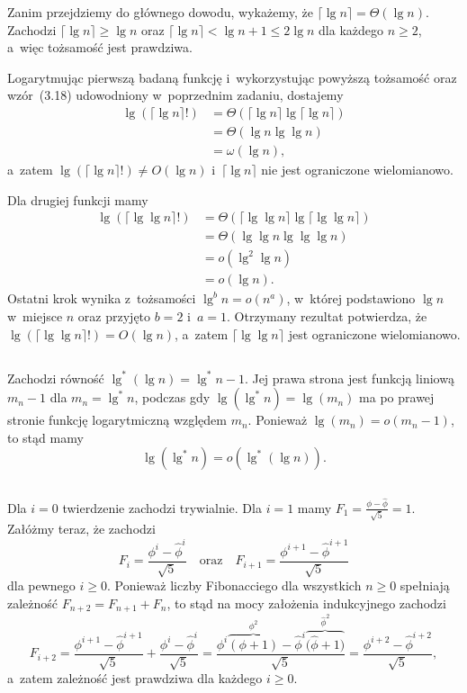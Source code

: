 Zanim przejdziemy do głównego dowodu, wykażemy, że $\lceil\lg n\rceil=\Theta(\lg n)$. Zachodzi $\lceil\lg n\rceil\ge\lg n$ oraz $\lceil\lg n\rceil<\lg n+1\le2\lg n$ dla każdego $n\ge2$, a~więc tożsamość jest prawdziwa.

Logarytmując pierwszą badaną funkcję i~wykorzystując powyższą tożsamość oraz wzór~(3.18) udowodniony w~poprzednim zadaniu, dostajemy
\begin{align*}
	\lg(\lceil\lg n\rceil!) &= \Theta(\lceil\lg n\rceil\lg\lceil\lg n\rceil) \\
	&= \Theta(\lg n\lg\lg n) \\
	&= \omega(\lg n),
\end{align*}
a~zatem $\lg(\lceil\lg n\rceil!)\ne O(\lg n)$ i~$\lceil\lg n\rceil$ nie jest ograniczone wielomianowo.

Dla drugiej funkcji mamy
\begin{align*}
	\lg(\lceil\lg\lg n\rceil!) &= \Theta(\lceil\lg\lg n\rceil\lg\lceil\lg\lg n\rceil) \\
	&= \Theta(\lg\lg n\lg\lg\lg n) \\
	&= o(\lg^2\lg n) \\
	&= o(\lg n).
\end{align*}
Ostatni krok wynika z~tożsamości $\lg^bn=o(n^a)$, w~której podstawiono $\lg n$ w~miejsce $n$ oraz przyjęto $b=2$ i~$a=1$. Otrzymany rezultat potwierdza, że $\lg(\lceil\lg\lg n\rceil!)=O(\lg n)$, a~zatem $\lceil\lg\lg n\rceil$ jest ograniczone wielomianowo.

\subsection{} %
Zachodzi równość $\lg^*(\lg n)=\lg^*n-1$. Jej prawa strona jest funkcją liniową $m_n-1$ dla $m_n=\lg^*n$, podczas gdy $\lg(\lg^*n) = \lg(m_n)$ ma po prawej stronie funkcję logarytmiczną względem $m_n$. Ponieważ $\lg(m_n)=o(m_n-1)$, to stąd mamy
\[
	\lg(\lg^*n) = o(\lg^*(\lg n)).
\]

\subsection{} %
Dla $i=0$ twierdzenie zachodzi trywialnie. Dla $i=1$ mamy $F_1=\frac{\phi-\widehat\phi}{\sqrt{5}}=1$. Załóżmy teraz, że zachodzi
\[
	F_i = \frac{\phi^i-\widehat\phi^i}{\sqrt{5}} \quad\text{oraz}\quad F_{i+1} = \frac{\phi^{i+1}-\widehat\phi^{i+1}}{\sqrt{5}}
\]
dla pewnego $i\ge0$. Ponieważ liczby Fibonacciego dla wszystkich $n\ge0$ spełniają zależność $F_{n+2}=F_{n+1}+F_n$, to stąd na mocy założenia indukcyjnego zachodzi
\[
	F_{i+2} = \frac{\phi^{i+1}-\widehat\phi^{i+1}}{\sqrt{5}}+\frac{\phi^i-\widehat\phi^i}{\sqrt{5}} = \frac{\phi^i\overbrace{(\phi+1)}^{\phi^2}-\widehat\phi^i\overbrace{\bigl(\widehat\phi+1\bigr)}^{\widehat\phi^2}}{\sqrt{5}} = \frac{\phi^{i+2}-\widehat\phi^{i+2}}{\sqrt{5}},
\]
a~zatem zależność jest prawdziwa dla każdego $i\ge0$.

